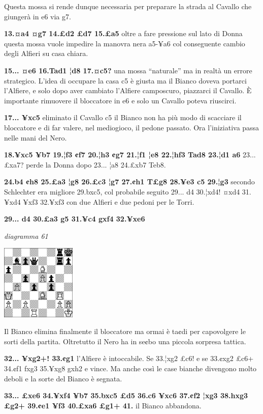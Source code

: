 \documentclass[
]{article}
\begin{document}
Questa mossa si rende dunque necessaria per preparare la strada al
Cavallo che giungerà in e6 via g7.

\textbf{13.¤a4 ¤g7 14.£d2 £d7 15.£a5} oltre a fare pressione sul lato di
Donna questa mossa vuole impedire la manovra nera a5-¥a6 col conseguente
cambio degli Alfieri su casa chiara.

\textbf{15... ¤e6 16.Tad1 ¦d8 17.¤c5?} una mossa ``naturale'' ma in
realtà un errore strategico. L'idea di occupare la casa c5 è giusta ma
il Bianco doveva portarci l'Alfiere, e solo dopo aver cambiato l'Alfiere
camposcuro, piazzarci il Cavallo. È importante rimuovere il bloccatore
in e6 e solo un Cavallo poteva riuscirci.

\textbf{17... ¥xc5} eliminato il Cavallo c5 il Bianco non ha più modo di
scacciare il bloccatore e di far valere, nel mediogioco, il pedone
passato. Ora l'iniziativa passa nelle mani del Nero.

\textbf{18.¥xc5 ¥b7 19.¦f3 ¢f7 20.¦h3 ¢g7 21.¦f1 ¦e8 22.¦hf3 Tad8 23.¦d1
a6} 23... £xa7? perde la Donna dopo 23... ¦a8 24.£xb7 Teb8.

\textbf{24.b4 ¢h8 25.£a3 ¦g8 26.£c3 ¦g7 27.¢h1 T£g8 28.¥e3 c5 29.¦g3}
secondo Schlechter era migliore 29.bxc5, col probabile seguito 29... d4
30.¦xd4! ¤xd4 31.¥xd4 ¥xf3 32.¥xf3 con due Alfieri e due pedoni per le
Torri.

\textbf{29... d4 30.£a3 g5 31.¥c4 gxf4 32.¥xe6}

\emph{diagramma 61}

\includegraphics[width=1.40972in,height=1.40972in]{vertopal_109f12be458a423d8f3cc838880eaea2/media/image61.png}

Il Bianco elimina finalmente il bloccatore ma ormai è ta¢di per
capovolgere le sorti della partita. Oltretutto il Nero ha in se¢bo una
piccola sorpresa tattica.

\textbf{32... ¥xg2+! 33.¢g1} l'Alfiere è intoccabile. Se 33.¦xg2 £c6! e
se 33.¢xg2 £c6+ 34.¢f1 fxg3 35.¥xg8 gxh2 e vince. Ma anche così le case
bianche divengono molto deboli e la sorte del Bianco è segnata.

\textbf{33... £xe6 34.¥xf4 ¥b7 35.bxc5 £d5 36.c6 ¥xc6 37.¢f2 ¦xg3
38.hxg3 £g2+ 39.¢e1 ¥f3 40.£xa6 £g1+ 41.} il Bianco abbandona.
\end{document}
